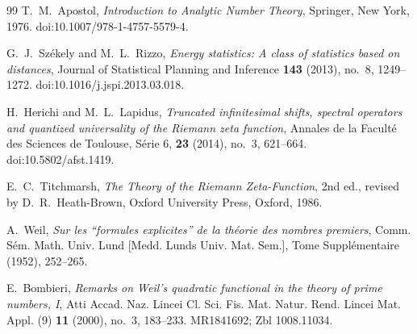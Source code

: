 \documentclass[11pt]{amsart}
\numberwithin{equation}{section}
\theoremstyle{plain}
\theoremstyle{definition}
\theoremstyle{remark}
\begin{document}
\begin{thebibliography}{99}
T.~M.~Apostol,
\emph{Introduction to Analytic Number Theory},
Springer, New York, 1976.
doi:10.1007/978-1-4757-5579-4.

G.~J.~Sz\'ekely and M.~L.~Rizzo,
\emph{Energy statistics: A class of statistics based on distances},
Journal of Statistical Planning and Inference \textbf{143} (2013), no.~8,
1249--1272.
doi:10.1016/j.jspi.2013.03.018.


H.~Herichi and M.~L.~Lapidus,
\emph{Truncated infinitesimal shifts, spectral operators and quantized
universality of the Riemann zeta function},
Annales de la Facult\'e des Sciences de Toulouse, S\'erie 6, \textbf{23}
(2014), no.~3, 621--664.
doi:10.5802/afst.1419.

E.~C.~Titchmarsh,
\emph{The Theory of the Riemann Zeta-Function},
2nd ed., revised by D.~R.~Heath-Brown,
Oxford University Press, Oxford, 1986.


A.~Weil,
\emph{Sur les ``formules explicites'' de la th\'eorie des nombres premiers},
Comm. S\'em. Math. Univ. Lund [Medd. Lunds Univ. Mat. Sem.],
Tome Suppl\'ementaire (1952), 252--265.

E.~Bombieri,
\emph{Remarks on Weil's quadratic functional in the theory of prime numbers, I},
Atti Accad. Naz. Lincei Cl. Sci. Fis. Mat. Natur. Rend. Lincei Mat. Appl.
(9) \textbf{11} (2000), no.~3, 183--233.
MR1841692; Zbl 1008.11034.

\end{thebibliography}
\end{document}
